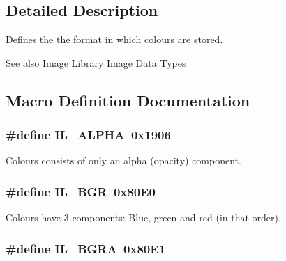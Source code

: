 \subsection{Detailed Description}
Defines the the format in which colours are stored. 

\begin{DoxySeeAlso}{See also}
\hyperlink{group__il__data__types}{Image Library Image Data Types} 
\end{DoxySeeAlso}


\subsection{Macro Definition Documentation}
\hypertarget{group__il__data__formats_ga8e13d65936f37fd5aa4a162b378992e5}{
\subsubsection[{I\+L\+\_\+\+A\+L\+P\+H\+A}]{\setlength{\rightskip}{0pt plus 5cm}\#define I\+L\+\_\+\+A\+L\+P\+H\+A~0x1906}}\label{group__il__data__formats_ga8e13d65936f37fd5aa4a162b378992e5}


Colours consists of only an alpha (opacity) component. 

\hypertarget{group__il__data__formats_gac1f7a347ffb9fb71744e9309acaa9f01}{
\subsubsection[{I\+L\+\_\+\+B\+G\+R}]{\setlength{\rightskip}{0pt plus 5cm}\#define I\+L\+\_\+\+B\+G\+R~0x80\+E0}}\label{group__il__data__formats_gac1f7a347ffb9fb71744e9309acaa9f01}


Colours have 3 components\+: Blue, green and red (in that order). 

\hypertarget{group__il__data__formats_gad01e1a54be1855fb19b68e5bd258b976}{
\subsubsection[{I\+L\+\_\+\+B\+G\+R\+A}]{\setlength{\rightskip}{0pt plus 5cm}\#define I\+L\+\_\+\+B\+G\+R\+A~0x80\+E1}}\label{group__il__data__formats_gad01e1a54be1855fb19b68e5bd258b976}


